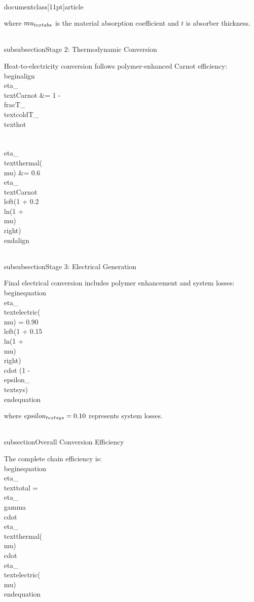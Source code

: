 \\documentclass[11pt]{article}
\begin{document}
where $\\mu_{\\text{abs}}$ is the material absorption coefficient and $t$ is absorber thickness.

\\subsubsection{Stage 2: Thermodynamic Conversion}

Heat-to-electricity conversion follows polymer-enhanced Carnot efficiency:
\\begin{align}
\\eta_{\\text{Carnot}} &= 1 - \\frac{T_{\\text{cold}}}{T_{\\text{hot}}} \\\\
\\eta_{\\text{thermal}}(\\mu) &= 0.6 \\eta_{\\text{Carnot}} \\left(1 + 0.2 \\ln(1 + \\mu)\\right)
\\end{align}

\\subsubsection{Stage 3: Electrical Generation}

Final electrical conversion includes polymer enhancement and system losses:
\\begin{equation}
\\eta_{\\text{electric}}(\\mu) = 0.90 \\left(1 + 0.15 \\ln(1 + \\mu)\\right) \\cdot (1 - \\epsilon_{\\text{sys}})
\\end{equation}

where $\\epsilon_{\\text{sys}} = 0.10$ represents system losses.

\\subsection{Overall Conversion Efficiency}

The complete chain efficiency is:
\\begin{equation}
\\eta_{\\text{total}} = \\eta_{\\gamma} \\cdot \\eta_{\\text{thermal}}(\\mu) \\cdot \\eta_{\\text{electric}}(\\mu)
\\end{equation}
\end{document}
